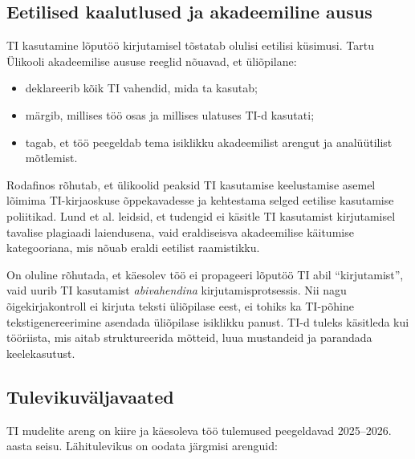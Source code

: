 \subsection{Eetilised kaalutlused ja akadeemiline ausus} \label{subsec:eetika}

TI kasutamine lõputöö kirjutamisel tõstatab olulisi eetilisi küsimusi. Tartu Ülikooli akadeemilise aususe reeglid \cite{tuati2026juhend} nõuavad, et üliõpilane:
\begin{itemize}
    \item deklareerib kõik TI vahendid, mida ta kasutab;
    \item märgib, millises töö osas ja millises ulatuses TI-d kasutati;
    \item tagab, et töö peegeldab tema isiklikku akadeemilist arengut ja analüütilist mõtlemist.
\end{itemize}

Rodafinos \cite{rodafinos2025integration} rõhutab, et ülikoolid peaksid TI kasutamise keelustamise asemel lõimima TI-kirjaoskuse õppekavadesse ja kehtestama selged eetilise kasutamise poliitikad. Lund et al. \cite{lund2025perceptions} leidsid, et tudengid ei käsitle TI kasutamist kirjutamisel tavalise plagiaadi laiendusena, vaid eraldiseisva akadeemilise käitumise kategooriana, mis nõuab eraldi eetilist raamistikku.

On oluline rõhutada, et käesolev töö ei propageeri lõputöö TI abil ``kirjutamist'', vaid uurib TI kasutamist \textit{abivahendina} kirjutamisprotsessis. Nii nagu õigekirjakontroll ei kirjuta teksti üliõpilase eest, ei tohiks ka TI-põhine tekstigenereerimine asendada üliõpilase isiklikku panust. TI-d tuleks käsitleda kui tööriista, mis aitab struktureerida mõtteid, luua mustandeid ja parandada keelekasutust.

\subsection{Tulevikuväljavaated} \label{subsec:tulevikuvaljavaated}

TI mudelite areng on kiire ja käesoleva töö tulemused peegeldavad 2025--2026. aasta seisu. Lähitulevikus on oodata järgmisi arenguid:

